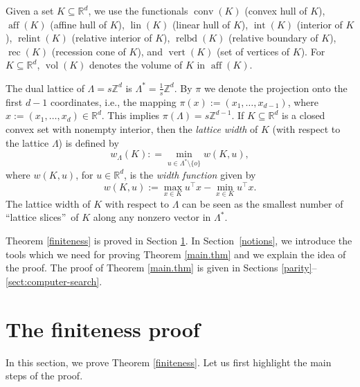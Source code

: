 \documentclass[a4paper]{article}
\theoremstyle{plain}
\begin{document}
Given a set $K \subseteq {\mathbb{R}}^d$, we use the functionals
${{\mathop{\mathrm{{conv}}}}}(K)$ (convex hull of $K$), ${{\mathop{\mathrm{{aff}}}}}(K)$ (affine hull of
$K$), ${{\mathop{\mathrm{{lin}}}}}(K)$ (linear hull of $K$), ${{\mathop{\mathrm{{int}}}}}(K)$ (interior
of $K$), ${{\mathop{\mathrm{{relint}}}}}(K)$ (relative interior of $K$),
${{\mathop{\mathrm{{relbd}}}}}(K)$ (relative boundary of $K$), ${{\mathop{\mathrm{{rec}}}}}(K)$ (recession
cone of $K$), and ${{\mathop{\mathrm{{vert}}}}}(K)$ (set of vertices of $K$). 
For $K \subseteq {\mathbb{R}}^d$, ${{\mathop{\mathrm{{vol}}}}}(K)$ denotes the volume of
$K$ in ${{\mathop{\mathrm{{aff}}}}}(K)$.

The dual lattice of $\Lambda= s {\mathbb{Z}}^d$  is  $\Lambda^\ast =
\frac{1}{s} {\mathbb{Z}}^d$.
By $\pi$ we denote the projection onto the first $d-1$
coordinates, i.e., the mapping $\pi(x) := (x_1, \ldots,
x_{d-1})$, where $x := (x_1, \ldots, x_d) \in {\mathbb{R}}^d$.
This implies $\pi(\Lambda) = s{\mathbb{Z}}^{d-1}$.
If $K \subseteq {\mathbb{R}}^d$ is a closed convex set with nonempty
interior, then the \emph{lattice width} of $K$ (with respect
to the lattice $\Lambda$) is defined by
$$ w_\Lambda(K) : = \min_{u \in \Lambda^\ast \setminus \{o\}}
   w(K,u),$$ 
where $w(K,u)$, for $u \in {\mathbb{R}}^d$, is the
\emph{width function} given by 
$$w(K,u) := \max_{x \in K} u^\top x - \min_{x \in K} u^\top
x.$$
The lattice width of $K$ with respect to $\Lambda$ can be
seen as the smallest number of \textquotedblleft lattice
slices\textquotedblright~of $K$ along any nonzero vector in
$\Lambda^\ast$. 

Theorem \ref{finiteness} is proved in Section
\ref{sec.finiteness}.
In Section~\ref{notions}, we introduce the tools which we
need for proving Theorem \ref{main.thm} and we explain the idea
of the proof.
The proof of Theorem \ref{main.thm} is given in
Sections \ref{parity}--\ref{sect:computer-search}.

\section{The finiteness proof} \label{sec.finiteness}

In this section, we prove Theorem \ref{finiteness}.
Let us first highlight the main steps of the proof.
\end{document}

